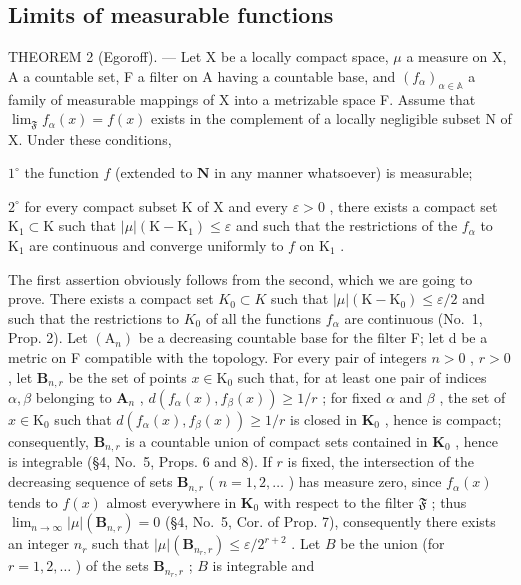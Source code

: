 \subsection{Limits of measurable functions}

THEOREM 2 (Egoroff). --- Let X be a locally compact space, \(\mu\) a measure on X, A a countable set, F a filter on A having a countable base, and \((f_{\alpha})_{\alpha\in\mathbb{A}}\) a family of measurable mappings of X into a metrizable space F. Assume that \(\lim_{\mathfrak{F}} f_{\alpha}(x) = f(x)\) exists in the complement of a locally negligible subset N of X. Under these conditions,

\(1^{\circ}\) the function \(f\) (extended to \(\mathbf{N}\) in any manner whatsoever) is measurable;

\(2^{\circ}\) for every compact subset K of X and every \(\varepsilon > 0\) , there exists a compact set \(\mathrm{K}_{1} \subset \mathrm{K}\) such that \(|\mu| (\mathrm{K} - \mathrm{K}_{1}) \leqslant \varepsilon\) and such that the restrictions of the \(f_{\alpha}\) to \(\mathrm{K}_{1}\) are continuous and converge uniformly to \(f\) on \(\mathrm{K}_{1}\) .

The first assertion obviously follows from the second, which we are going to prove. There exists a compact set \(K_{0} \subset K\) such that \(|\mu|(\mathrm{K} - \mathrm{K}_{0}) \leqslant \varepsilon/2\) and such that the restrictions to \(K_{0}\) of all the functions \(f_{\alpha}\) are continuous (No.~1, Prop. 2). Let \((\mathrm{A}_{n})\) be a decreasing countable base for the filter F; let d be a metric on F compatible with the topology. For every pair of integers \(n > 0\) , \(r > 0\) , let \(\mathbf{B}_{n,r}\) be the set of points \(x \in \mathrm{K}_0\) such that, for at least one pair of indices \(\alpha, \beta\) belonging to \(\mathbf{A}_n\) , \(d(f_{\alpha}(x), f_{\beta}(x)) \geqslant 1 / r\) ; for fixed \(\alpha\) and \(\beta\) , the set of \(x \in \mathrm{K}_0\) such that \(d(f_{\alpha}(x), f_{\beta}(x)) \geqslant 1 / r\) is closed in \(\mathbf{K}_0\) , hence is compact; consequently, \(\mathbf{B}_{n,r}\) is a countable union of compact sets contained in \(\mathbf{K}_0\) , hence is integrable (§4, No.~5, Props. 6 and 8). If \(r\) is fixed, the intersection of the decreasing sequence of sets \(\mathbf{B}_{n,r}\) ( \(n = 1,2,\ldots\) ) has measure zero, since \(f_{\alpha}(x)\) tends to \(f(x)\) almost everywhere in \(\mathbf{K}_0\) with respect to the filter \(\mathfrak{F}\) ; thus \(\lim_{n \to \infty} |\mu|(\mathbf{B}_{n,r}) = 0\) (§4, No.~5, Cor. of Prop. 7), consequently there exists an integer \(n_r\) such that \(|\mu|(\mathbf{B}_{n_r,r}) \leqslant \varepsilon / 2^{r+2}\) . Let \(B\) be the union (for \(r = 1,2,\ldots\) ) of the sets \(\mathbf{B}_{n_r,r}\) ; \(B\) is integrable and

